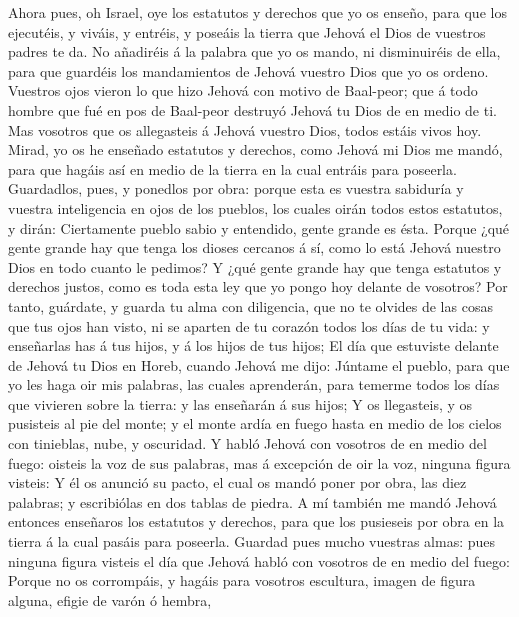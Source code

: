  Ahora pues, oh Israel, oye los estatutos y derechos que yo
os enseño, para que los ejecutéis, y viváis, y entréis, y poseáis la
tierra que Jehová el Dios de vuestros padres te da.  No
añadiréis á la palabra que yo os mando, ni disminuiréis de ella, para
que guardéis los mandamientos de Jehová vuestro Dios que yo os ordeno.
 Vuestros ojos vieron lo que hizo Jehová con motivo de
Baal-peor; que á todo hombre que fué en pos de Baal-peor destruyó Jehová
tu Dios de en medio de ti.  Mas vosotros que os allegasteis
á Jehová vuestro Dios, todos estáis vivos hoy.  Mirad, yo os
he enseñado estatutos y derechos, como Jehová mi Dios me mandó, para que
hagáis así en medio de la tierra en la cual entráis para poseerla.
 Guardadlos, pues, y ponedlos por obra: porque esta es
vuestra sabiduría y vuestra inteligencia en ojos de los pueblos, los
cuales oirán todos estos estatutos, y dirán: Ciertamente pueblo sabio y
entendido, gente grande es ésta.  Porque ¿qué gente grande
hay que tenga los dioses cercanos á sí, como lo está Jehová nuestro Dios
en todo cuanto le pedimos?  Y ¿qué gente grande hay que
tenga estatutos y derechos justos, como es toda esta ley que yo pongo
hoy delante de vosotros?  Por tanto, guárdate, y guarda tu
alma con diligencia, que no te olvides de las cosas que tus ojos han
visto, ni se aparten de tu corazón todos los días de tu vida: y
enseñarlas has á tus hijos, y á los hijos de tus hijos;  El
día que estuviste delante de Jehová tu Dios en Horeb, cuando Jehová me
dijo: Júntame el pueblo, para que yo les haga oir mis palabras, las
cuales aprenderán, para temerme todos los días que vivieren sobre la
tierra: y las enseñarán á sus hijos;  Y os llegasteis, y os
pusisteis al pie del monte; y el monte ardía en fuego hasta en medio de
los cielos con tinieblas, nube, y oscuridad.  Y habló
Jehová con vosotros de en medio del fuego: oisteis la voz de sus
palabras, mas á excepción de oir la voz, ninguna figura visteis:
 Y él os anunció su pacto, el cual os mandó poner por obra,
las diez palabras; y escribiólas en dos tablas de piedra. 
A mí también me mandó Jehová entonces enseñaros los estatutos y
derechos, para que los pusieseis por obra en la tierra á la cual pasáis
para poseerla.  Guardad pues mucho vuestras almas: pues
ninguna figura visteis el día que Jehová habló con vosotros de en medio
del fuego:  Porque no os corrompáis, y hagáis para vosotros
escultura, imagen de figura alguna, efigie de varón ó hembra,
